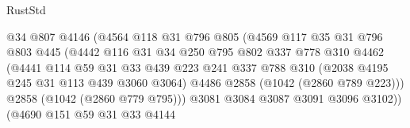 \begin{lexlean}{RustStd}
\begin{coremodule}
                                    @34
                                    @807
                                    @4146
                                    (@4564
                                      @118
                                      @31
                                      @796
                                      @805
                                      (@4569
                                        @117
                                        @35
                                        @31
                                        @796
                                        @803
                                        @445
                                        (@4442
                                          @116
                                          @31
                                          @34
                                          @250
                                          @795
                                          @802
                                          @337
                                          @778
                                          @310
                                          @4462
                                          (@4441
                                            @114
                                            @59
                                            @31
                                            @33
                                            @439
                                            @223
                                            @241
                                            @337
                                            @788
                                            @310
                                            (@2038 @4195 @245 @31 @113 @439 @3060 @3064)
                                            @4486
                                            @2858
                                            (@1042 (@2860 @789 @223)))
                                          @2858
                                          (@1042 (@2860 @779 @795)))
                                        @3081
                                        @3084
                                        @3087
                                        @3091
                                        @3096
                                        @3102))
                                    (@4690
                                      @151
                                      @59
                                      @31
                                      @33
                                      @4144

\end{coremodule}
\end{lexlean}
